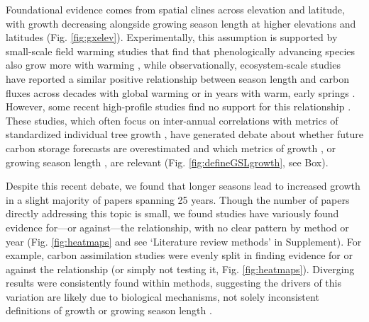 \documentclass[11pt]{article}
\newcommand{\R}[1]{\label{#1}\linelabel{#1}}
\begin{document}
Foundational evidence comes from spatial clines across elevation and latitude, with growth decreasing alongside growing season length at higher elevations and latitudes (Fig. \ref{fig:gxelev}). Experimentally, this assumption is supported by small-scale field warming studies that find that phenologically advancing species also grow more with warming \citep[][]{Cleland:2012}, while observationally, ecosystem-scale studies have reported a similar positive relationship between season length and carbon fluxes across decades with global warming \citep{keenan2014net} or in years with warm, early springs \citep{chen1999effects}. However, some recent high-profile studies find no support for this relationship \citep{dow2022warm}. These studies, which often focus on inter-annual correlations with metrics of standardized individual tree growth \citep{dow2022warm,silvestro2023longer}, have generated debate about whether future carbon storage forecasts are overestimated and which metrics of growth \citep{green2022limits}, or growing season length \citep{korner2023four}, are relevant (Fig. \ref{fig:defineGSLgrowth}, see Box).\R{R1box0}

Despite this recent debate, we found that longer seasons lead to increased growth in a slight majority of papers spanning  25 years. Though the number of papers directly addressing this topic is small, we found studies have variously found evidence for---or against---the relationship, with no clear pattern by method or year (Fig. \ref{fig:heatmaps} and see `Literature review methods' in Supplement). For example, carbon assimilation studies were evenly split in finding evidence for or against the relationship  (or simply not testing it, Fig. \ref{fig:heatmaps}). Diverging results were consistently found within methods, suggesting the drivers of this variation are likely due to biological mechanisms, not solely inconsistent definitions of growth or growing season length \citep[as some have recently suggested, e.g. ][see also Fig. \ref{fig:defineGSLgrowth}]{green2022limits,korner2023four}. 
\end{document}
